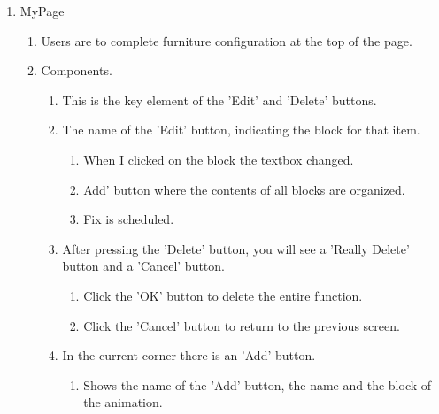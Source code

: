 \documentclass[11pt, conference]{IEEEtran}
\begin{document}
\begin{enumerate}[label=\arabic*]
    \item {\large{MyPage}}
    \begin{enumerate}[label=\alph*]
        \item Users are to complete furniture configuration at the top of the page.
        \item Components.
        \begin{enumerate}
            \item This is the key element of the 'Edit' and 'Delete' buttons.
            \item The name of the 'Edit' button, indicating the block for that item.
            \begin{enumerate}[label=\arabic*]
                \item When I clicked on the block the textbox changed.
                \item Add' button where the contents of all blocks are organized.
                \item Fix is scheduled.
        \end{enumerate}
            \item After pressing the 'Delete' button, you will see a 'Really Delete' button and a 'Cancel' button.
            \begin{enumerate}[label=\arabic*]
                \item Click the 'OK' button to delete the entire function.
                \item Click the 'Cancel' button to return to the previous screen.
        \end{enumerate}
            \item In the current corner there is an 'Add' button.
            \begin{enumerate}[label=\arabic*]
                \item Shows the name of the 'Add' button, the name and the block of the animation.

\end{enumerate}
\end{enumerate}
\end{enumerate}
\end{enumerate}
\end{document}

